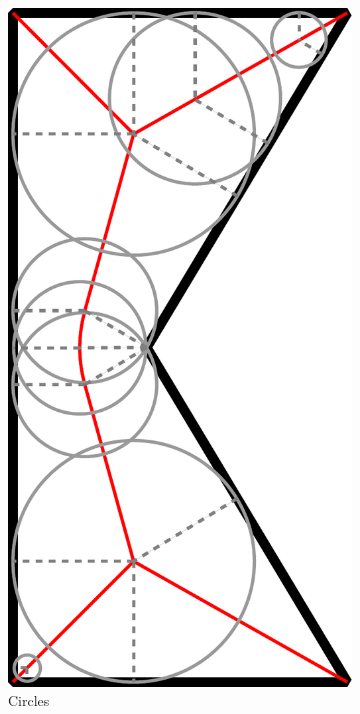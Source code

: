 

\begin{figure}
\centering
\begin{subfigure}{0.3\columnwidth}
\centering
\includegraphics[height=1.5\columnwidth]{sources/method/MAT_explanation_circles.pdf}
\caption{Circles}
\label{MAT_explanation_circles}
\end{subfigure}
\begin{subfigure}{0.3\columnwidth}
\centering

\end{subfigure}
\end{figure}
